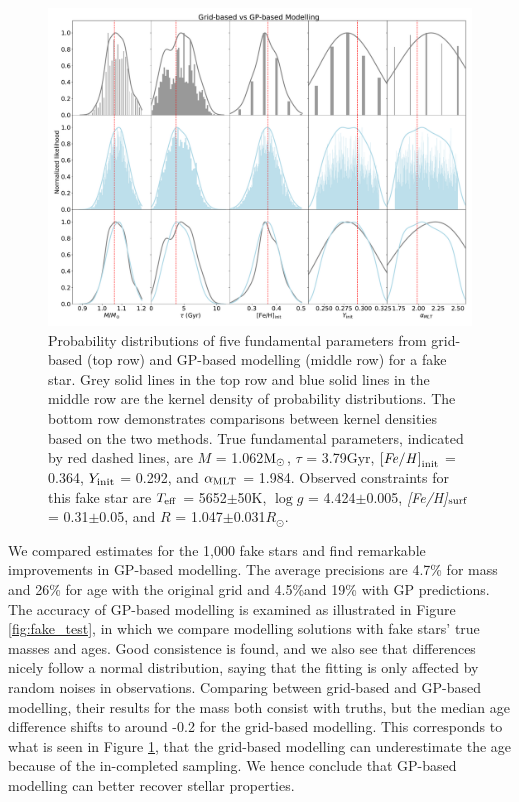 \begin{figure}
	\includegraphics[width=1.9\columnwidth]{gp_fitting.pdf}
    \caption{Probability distributions of five fundamental parameters from grid-based (top row) and GP-based modelling (middle row) for a fake star. Grey solid lines in the top row and blue solid lines in the middle row are the kernel density of probability distributions. The bottom row demonstrates comparisons between kernel densities based on the two methods. True fundamental parameters, indicated by red dashed lines, are $M$ = 1.062$\rm M_{\odot}$, $\tau$ = 3.79Gyr, $\rm {\it [Fe/H]}_{init}$ = 0.364, $Y_{\rm init}$ = 0.292, and $\alpha_{\rm MLT}$ = 1.984. Observed constraints for this fake star are $T_{\rm eff}$ = 5652$\pm$50K, $\log g$ = 4.424$\pm$0.005, {\it [Fe/H]}$_{\rm surf}$ =  0.31$\pm$0.05, and $R$ =  1.047$\pm$0.031$R_{\odot}$. } 
  \label{fig:fit_comparison}
\end{figure}

We compared estimates for the 1,000 fake stars and find remarkable improvements in GP-based modelling. 
The average precisions are 4.7\% for mass and 26\% for age with the original grid and 4.5\%and 19\% with GP predictions. 
%
The accuracy of GP-based modelling is examined as illustrated in Figure \ref{fig:fake_test}, in which we compare modelling solutions with fake stars'  true masses and ages.
Good consistence is found, and we also see that differences nicely follow a normal distribution, saying that the fitting is only affected by random noises in observations. 
%
Comparing between grid-based and GP-based modelling, their results for the mass both consist with truths, but the median age difference shifts to around -0.2 for the grid-based modelling. This corresponds to what is seen in Figure \ref{fig:fit_comparison}, that the grid-based modelling can underestimate the age because of the in-completed sampling. We hence conclude that GP-based modelling can better recover stellar properties.

